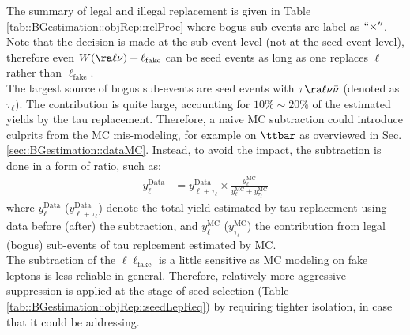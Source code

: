 \noindent The summary of legal and illegal replacement is given in Table \ref{tab::BGestimation::objRep::relProc} where bogus sub-events are label as $``\times''$.
Note that the decision is made at the sub-event level (not at the seed event level), therefore even $W(\ra \ell \nu)+\ell_{\mathrm{fake}}$ can be seed events as long as one replaces $\ell$ rather than $\ell_{\mathrm{fake}}$.  \\

The largest source of bogus sub-events are seed events with $\tau \ra \ell \nu\bar{\nu}$ (denoted as $\tau_{\ell}$).
The contribution is quite large, accounting for $10\%\sim20\%$ of the estimated yields by the tau replacement. Therefore, a naive MC subtraction could introduce culprits from the MC mis-modeling, for example on $\ttbar$ as overviewed in Sec. \ref{sec::BGestimation::dataMC}. Instead, to avoid the impact, the subtraction is done in a form of ratio, such as:
\begin{align}
  y^{\mathrm{Data}}_{\ell} 
  & = y^{\mathrm{Data}}_{\ell+\tau_{\ell}} \times \frac{y^{\mathrm{MC}}_{\ell}}{y^{\mathrm{MC}}_{\ell}+y^{\mathrm{MC}}_{\tau_{\ell}}}  
\end{align}
where $y^{\mathrm{Data}}_{\ell}$ ($y^{\mathrm{Data}}_{\ell+\tau_{\ell}}$) denote the total yield estimated by tau replacement using data before (after) the subtraction, and $y^{\mathrm{MC}}_{\ell}$ ($y^{\mathrm{MC}}_{\tau_{\mathrm{\ell}}}$) the contribution from legal (bogus) sub-events of tau replcement estimated by MC. \\

The subtraction of the $\ell\ell_{\mathrm{fake}}$ is a little sensitive as MC modeling on fake leptons is less reliable in general. Therefore, relatively more aggressive suppression is applied at the stage of seed selection (Table \ref{tab::BGestimation::objRep::seedLepReq}) by requiring tighter isolation, in case that it could be addressing. \\


